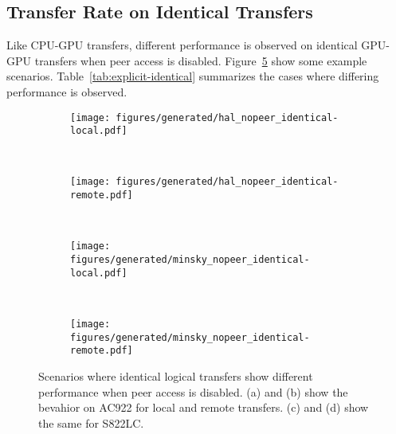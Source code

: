 \subsection{Transfer Rate on Identical Transfers}
\label{sec:explicit-peer-identical}

Like CPU-GPU transfers, different performance is observed on identical GPU-GPU transfers when peer access is disabled.
Figure~\ref{fig:explicit-nopeer-identical} show some example scenarios.
Table~\ref{tab:explicit-identical} summarizes the cases where differing performance is observed.

\begin{figure}[ht]
    \centering
    \begin{subfigure}[b]{0.4\textwidth}
        \texttt{[image: figures/generated/hal\_nopeer\_identical-local.pdf]}
        \caption{}
        \label{fig:}
    \end{subfigure}
    ~
    \begin{subfigure}[b]{0.4\textwidth}
        \texttt{[image: figures/generated/hal\_nopeer\_identical-remote.pdf]}
        \caption{}
        \label{fig:}
    \end{subfigure}
    \\
    \begin{subfigure}[b]{0.4\textwidth}
        \texttt{[image: figures/generated/minsky\_nopeer\_identical-local.pdf]}
        \caption{}
        \label{fig:}
    \end{subfigure}
    ~
    \begin{subfigure}[b]{0.4\textwidth}
        \texttt{[image: figures/generated/minsky\_nopeer\_identical-remote.pdf]}
        \caption{}
        \label{fig:}
    \end{subfigure}
    \caption[]{
        Scenarios where identical logical transfers show different performance when peer access is disabled.
        (a) and (b) show the bevahior on AC922 for local and remote transfers.
        (c) and (d) show the same for S822LC.
    }
    \label{fig:explicit-nopeer-identical}
\end{figure}

